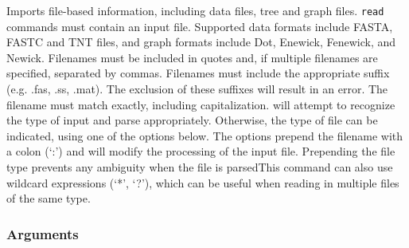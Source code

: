 	\begin{phygdescription}
		{Imports file-based information, including data files, tree and graph files. \texttt{read} 
		commands must contain an input file. Supported data formats include FASTA, FASTC
		and TNT files, and graph formats include Dot, Enewick, Fenewick, and Newick. 
		Filenames must be included in quotes and, if multiple filenames are specified, 
		separated by commas. Filenames must include the appropriate suffix (e.g. .fas, 
		.ss, .mat). The exclusion of these suffixes will result in an error. The filename must
		match exactly, including capitalization. \phyg will attempt to recognize the type of input
		and parse appropriately. Otherwise, the type of file can be indicated, using one of the 
		options below. The options prepend 	the filename with a colon (`:') and will modify the 
		processing of the input file. Prepending the file type prevents any ambiguity when the 
		file is parsedThis command can also use wildcard expressions (`*', `?'), 
		which can be useful when reading in multiple files of the same type.}
	\end{phygdescription}

	\subsubsection{Arguments}
	
